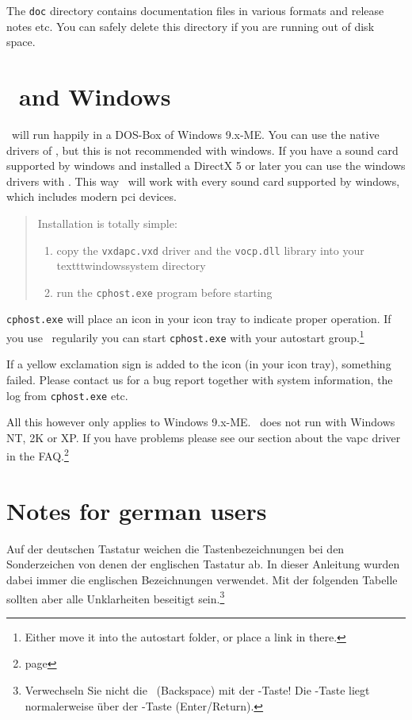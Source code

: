 The \texttt{doc} directory contains documentation files in various formats
and release notes etc. You can safely delete this directory if you are running
out of disk space.

\section{\cp\ and Windows}
\cp\ will run happily in a DOS-Box of Windows 9.x-ME. You can use the
native drivers of \cp, but this is not recommended with windows.
If you have a sound card supported by windows and installed a DirectX 5 or later
you can use the windows drivers with \cp. This way \cp\ will work with
every sound card supported by windows, which includes modern pci devices.

\begin{quote}
Installation is totally simple:
\begin{enumerate}
\item copy the \texttt{vxdapc.vxd} driver and the \texttt{vocp.dll} library into your texttt{windowssystem} directory
\item run the \texttt{cphost.exe} program before starting \cp\
\end{enumerate}
\end{quote}

\texttt{cphost.exe} will place an icon in your icon tray to indicate proper operation. If you use \cp\ regularily you can start \texttt{cphost.exe} with your autostart group.\footnote{Either move it into the autostart folder, or place a link in there.}

If a yellow exclamation sign is added to the icon (in your icon tray), something failed. Please contact us for a bug report together with system information, the log from \texttt{cphost.exe} etc.

All this however only applies to Windows 9.x-ME. \cp\ does not run
with Windows NT, 2K or XP. If you have problems please see our section
about the vapc driver in the FAQ.\footnote{page \pageref{faqvapc}}

\section{Notes for german users}
Auf der deutschen Tastatur weichen die Tastenbezeichnungen bei den Sonderzeichen
von denen der englischen Tastatur ab. In dieser Anleitung wurden dabei immer die
englischen Bezeichnungen verwendet. Mit der folgenden Tabelle sollten aber alle
Unklarheiten beseitigt sein.\footnote{Verwechseln Sie nicht die
\keys{$\longleftarrow$}\ (Backspace) mit der \keys{$\leftarrow$}-Taste! Die
\keys{$\longleftarrow$}-Taste liegt normalerweise \"uber der
\keys{$\hookleftarrow$}-Taste (Enter/Return).}

